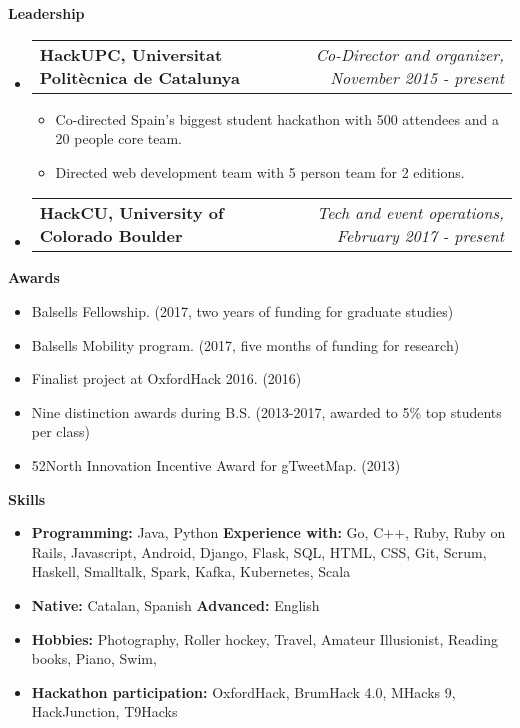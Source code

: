 \documentclass[letterpaper,10pt]{article}
\makeatletter
\newcommand{\resitem}[1]{\item #1 \vspace{-2pt}}
\newcommand{\resheading}[1]{{\large \colorbox{mygrey}{\begin{minipage}{\textwidth}{\textbf{#1 \vphantom{p\^{E}}}}\end{minipage}}}}
\newcommand{\ressubheading}[4]{
\begin{tabular*}{7.0in}{l@{\extracolsep{\fill}}r}
		\textbf{#1} & \textit{#4} \\
\end{tabular*}\vspace{-6pt}}
\makeatother
\begin{document}
\resheading{Leadership}

\begin{itemize}
\item
	\ressubheading{HackUPC, Universitat Polit\`ecnica de Catalunya}{Barcelona, Spain}{Co-Director and organizer}{Co-Director and organizer, November 2015 - present}
	\begin{itemize}
		\item Co-directed Spain's biggest student hackathon with 500 attendees and a 20 people core team.
		\item Directed web development team with 5 person team for 2 editions.
	\end{itemize}
\item 
	\ressubheading{HackCU, University of Colorado Boulder}{Boulder, CO}{Web development and Event Operations}{Tech and event operations, February 2017 - present}
\end{itemize}

\resheading{Awards}
\begin{itemize}
    \resitem{Balsells Fellowship. (2017, two years of funding for graduate studies)}
    \resitem{Balsells Mobility program. (2017, five months of funding for research)}
    \resitem{Finalist project at OxfordHack 2016. (2016)}
    \resitem{Nine distinction awards during B.S. (2013-2017, awarded to 5\% top students per class)}
    \resitem{52North Innovation Incentive Award for gTweetMap. (2013)}
\end{itemize}

\resheading{Skills}
\begin{itemize}
	\resitem{\textbf{Programming:} Java, Python \textbf{Experience with:}  Go, C++, Ruby, Ruby on Rails, Javascript, Android, Django, Flask, SQL, HTML, CSS, Git, Scrum, Haskell, Smalltalk, Spark, Kafka, Kubernetes, Scala}
	\resitem{\textbf{Native:} Catalan, Spanish \textbf{Advanced:} English}
	\resitem{\textbf{Hobbies:} Photography, Roller hockey, Travel, Amateur Illusionist, Reading books, Piano, Swim, }
	\resitem{\textbf{Hackathon participation:} OxfordHack, BrumHack 4.0, MHacks 9, HackJunction, T9Hacks}

\end{itemize}
\end{document}

